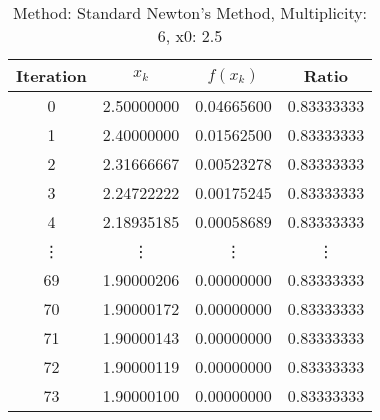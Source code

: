 \begin{table}
\centering
\caption{Method: Standard Newton's Method, Multiplicity: 6, x0: 2.5}
\label{tab:table_Standard_Newton's_Method_6_2_5}
\begin{tabular}{c c c c}
\toprule
Iteration &      $x_k$ &   $f(x_k)$ &      Ratio \\
\midrule
        0 & 2.50000000 & 0.04665600 & 0.83333333 \\
        1 & 2.40000000 & 0.01562500 & 0.83333333 \\
        2 & 2.31666667 & 0.00523278 & 0.83333333 \\
        3 & 2.24722222 & 0.00175245 & 0.83333333 \\
        4 & 2.18935185 & 0.00058689 & 0.83333333 \\
   \vdots &     \vdots &     \vdots &     \vdots \\
       69 & 1.90000206 & 0.00000000 & 0.83333333 \\
       70 & 1.90000172 & 0.00000000 & 0.83333333 \\
       71 & 1.90000143 & 0.00000000 & 0.83333333 \\
       72 & 1.90000119 & 0.00000000 & 0.83333333 \\
       73 & 1.90000100 & 0.00000000 & 0.83333333 \\
\bottomrule
\end{tabular}
\end{table}
